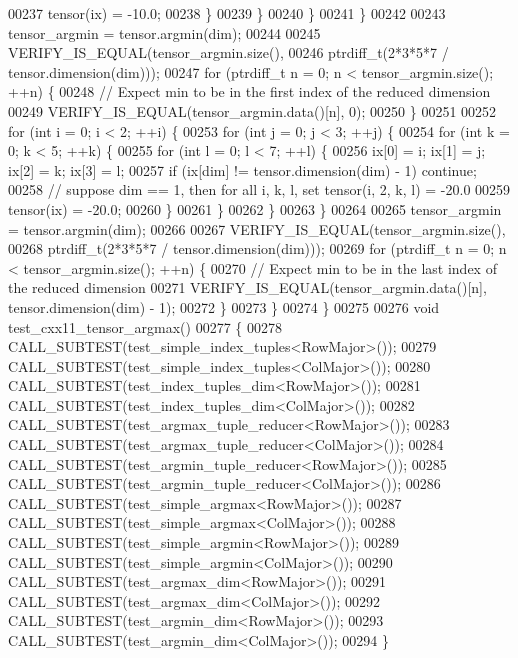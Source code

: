 \begin{DoxyCode}
00237             tensor(ix) = -10.0;
00238           \}
00239         \}
00240       \}
00241     \}
00242 
00243     tensor\_argmin = tensor.argmin(dim);
00244 
00245     VERIFY\_IS\_EQUAL(tensor\_argmin.size(),
00246                     ptrdiff\_t(2*3*5*7 / tensor.dimension(dim)));
00247     \textcolor{keywordflow}{for} (ptrdiff\_t n = 0; n < tensor\_argmin.size(); ++n) \{
00248       \textcolor{comment}{// Expect min to be in the first index of the reduced dimension}
00249       VERIFY\_IS\_EQUAL(tensor\_argmin.data()[n], 0);
00250     \}
00251 
00252     \textcolor{keywordflow}{for} (\textcolor{keywordtype}{int} i = 0; i < 2; ++i) \{
00253       \textcolor{keywordflow}{for} (\textcolor{keywordtype}{int} j = 0; j < 3; ++j) \{
00254         \textcolor{keywordflow}{for} (\textcolor{keywordtype}{int} k = 0; k < 5; ++k) \{
00255           \textcolor{keywordflow}{for} (\textcolor{keywordtype}{int} l = 0; l < 7; ++l) \{
00256             ix[0] = i; ix[1] = j; ix[2] = k; ix[3] = l;
00257             \textcolor{keywordflow}{if} (ix[dim] != tensor.dimension(dim) - 1) \textcolor{keywordflow}{continue};
00258             \textcolor{comment}{// suppose dim == 1, then for all i, k, l, set tensor(i, 2, k, l) = -20.0}
00259             tensor(ix) = -20.0;
00260           \}
00261         \}
00262       \}
00263     \}
00264 
00265     tensor\_argmin = tensor.argmin(dim);
00266 
00267     VERIFY\_IS\_EQUAL(tensor\_argmin.size(),
00268                     ptrdiff\_t(2*3*5*7 / tensor.dimension(dim)));
00269     \textcolor{keywordflow}{for} (ptrdiff\_t n = 0; n < tensor\_argmin.size(); ++n) \{
00270       \textcolor{comment}{// Expect min to be in the last index of the reduced dimension}
00271       VERIFY\_IS\_EQUAL(tensor\_argmin.data()[n], tensor.dimension(dim) - 1);
00272     \}
00273   \}
00274 \}
00275 
00276 \textcolor{keywordtype}{void} test\_cxx11\_tensor\_argmax()
00277 \{
00278   CALL\_SUBTEST(test\_simple\_index\_tuples<RowMajor>());
00279   CALL\_SUBTEST(test\_simple\_index\_tuples<ColMajor>());
00280   CALL\_SUBTEST(test\_index\_tuples\_dim<RowMajor>());
00281   CALL\_SUBTEST(test\_index\_tuples\_dim<ColMajor>());
00282   CALL\_SUBTEST(test\_argmax\_tuple\_reducer<RowMajor>());
00283   CALL\_SUBTEST(test\_argmax\_tuple\_reducer<ColMajor>());
00284   CALL\_SUBTEST(test\_argmin\_tuple\_reducer<RowMajor>());
00285   CALL\_SUBTEST(test\_argmin\_tuple\_reducer<ColMajor>());
00286   CALL\_SUBTEST(test\_simple\_argmax<RowMajor>());
00287   CALL\_SUBTEST(test\_simple\_argmax<ColMajor>());
00288   CALL\_SUBTEST(test\_simple\_argmin<RowMajor>());
00289   CALL\_SUBTEST(test\_simple\_argmin<ColMajor>());
00290   CALL\_SUBTEST(test\_argmax\_dim<RowMajor>());
00291   CALL\_SUBTEST(test\_argmax\_dim<ColMajor>());
00292   CALL\_SUBTEST(test\_argmin\_dim<RowMajor>());
00293   CALL\_SUBTEST(test\_argmin\_dim<ColMajor>());
00294 \}
\end{DoxyCode}
